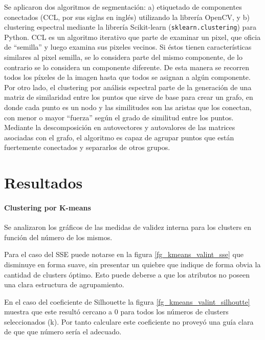\documentclass{article}
\begin{document}
Se aplicaron dos algoritmos de segmentación: a) etiquetado de componentes conectados (CCL, por sus siglas en inglés) utilizando la librería OpenCV, y b) clustering espectral mediante la librería Scikit-learn (\verb'sklearn.clustering') para Python.
CCL es un algoritmo iterativo que parte de examinar un pixel, que oficia de ``semilla'' y luego examina sus pixeles vecinos.
Si éstos tienen características similares al pixel semilla, se lo considera parte del mismo componente, de lo contrario se lo considera un componente diferente.
De esta manera se recorren todos los píxeles de la imagen hasta que todos se asignan a algún componente.
Por otro lado, el clustering por análisis espectral parte de la generación de una matriz de similaridad entre los puntos que sirve de base para crear un grafo, en donde cada punto es un nodo y las similitudes son las aristas que los conectan, con menor o mayor ``fuerza'' según el grado de similitud entre los puntos.
Mediante la descomposición en autovectores y autovalores de las matrices asociadas con el grafo, el algoritmo es capaz de agrupar puntos que están fuertemente conectados y separarlos de otros grupos.  


\section{Resultados}

\paragraph{Clustering por K-means}
Se analizaron los gráficos de las medidas de validez interna para los clusters en función del número de los mismos.

Para el caso del SSE puede notarse en la figura \ref{fg_kmeans_valint_sse} que disminuye en forma suave, sin presentar un quiebre que indique de forma obvia la cantidad de clusters óptimo.
Esto puede deberse a que los atributos no poseen una clara estructura de agrupamiento.

En el caso del coeficiente de Silhouette la figura \ref{fg_kmeans_valint_silhoutte} muestra que este resultó cercano a 0 para todos los números de clusters seleccionados (k).
Por tanto calculare este coeficiente no proveyó una guía clara de que que número sería el adecuado.
\end{document}
